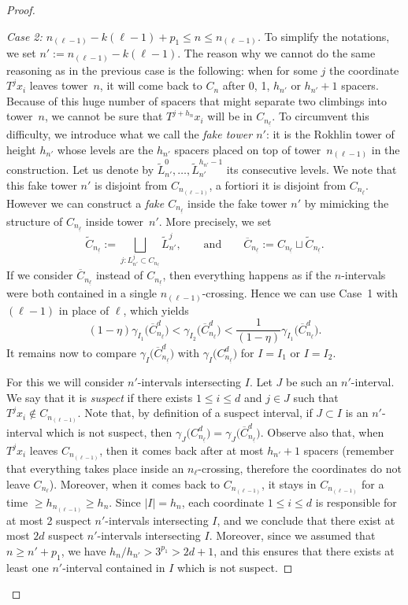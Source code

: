 \documentclass[AHL,Unicode,longabstracts]{cedram}
\newcommand{\egdef}{:=}
\newcommand{\cd}{C^{d}}
\newcommand{\lb}{\underline{\ell}}
\newcommand{\Gam}[1]{\gamma_{#1}\bigl(\cd_{n_{\lb}}\bigr)}
\newcommand{\Gamb}[1]{\gamma_{#1}\bigl(\overline{C}^d_{n_{\lb}}\bigr)}
\begin{document}
\begin{proof}
\begin{proof}[Case 2: $n_{(\ell-1)}-k(\ell-1)+p_1\le n\le n_{(\ell-1)}$]
To simplify the notations, we set $n'\egdef n_{(\ell-1)}-k(\ell-1)$. The reason why we cannot do the same reasoning as in the previous case is the following: when for some $j$ the coordinate $T^jx_i$ leaves tower~$n$, it will come back to $C_n$ after 0, 1, $h_{n'}$ or $h_{n'}+1$ spacers. Because of this huge number of spacers that might separate two climbings into tower~$n$, we cannot be sure that $T^{j+h_n}x_i$ will be in $C_{n_{\lb}}$. To circumvent this difficulty, we introduce what we call the \emph{fake tower $n'$}: it is the Rokhlin tower of height $h_{n'}$ whose levels are the $h_{n'}$ spacers placed on top of tower~$n_{(\ell-1)}$ in the construction. Let us denote by $\tilde L_{n'}^0,\ldots,\tilde L_{n'}^{h_{n'}-1}$ its consecutive levels. We note that this fake tower $n'$ is disjoint from $C_{n_{(\ell-1)}}$, a fortiori it is disjoint from $C_{n_{\lb}}$. However we can construct a \emph{fake $C_{n_{\lb}}$} inside the fake tower $n'$ by mimicking the structure of $C_{n_{\lb}}$ inside tower~$n'$. More precisely, we set
\[
\tilde C_{n_{\lb}} \egdef \bigsqcup_{j:L_{n'}^j\subset C_{n_{\lb}}} \tilde L_{n'}^j, \qquad\text{and}\qquad
\overline{C}_{n_{\lb}}\egdef C_{n_{\lb}}\sqcup \tilde C_{n_{\lb}}.
\]
If we consider $\overline{C}_{n_{\lb}}$ instead of $C_{n_{\lb}}$, then everything happens as if the $n$-intervals were both contained in a single $n_{(\ell-1)}$-crossing. Hence we can use Case~1 with $(\ell-1)$ in place of $\ell$, which yields
\begin{equation}\label{eq:case1withfake}
(1-\eta) \Gamb{I_1} < \Gamb{I_2} < \frac{1}{(1-\eta)} \Gamb{I_1}.
\end{equation}
It remains now to compare $\Gamb{I}$ with $\Gam{I}$ for $I=I_1$ or $I=I_2$.

For this we will consider $n'$-intervals intersecting $I$. Let $J$ be such an $n'$-interval. We say that it is \emph{suspect} if there exists $1\le i \le d$ and $j\in J$ such that $T^jx_i \notin C_{n_{(\ell-1)}}$. Note that, by definition of a suspect interval, if $J\subset I$ is an $n'$-interval which is not suspect, then $\Gam{J}=\Gamb{J}$. Observe also that, when $T^jx_i$ leaves $C_{n_{(\ell-1)}}$, then it comes back after at most $h_{n'}+1$ spacers (remember that everything takes place inside an $n_{\ell}$-crossing, therefore the coordinates do not leave $C_{n_\ell}$). Moreover, when it comes back to $C_{n_{(\ell-1)}}$, it stays in $C_{n_{(\ell-1)}}$ for a time $\ge h_{n_{(\ell-1)}}\ge h_n$. Since $|I|=h_n$, each coordinate $1\le i\le d$ is responsible for at most 2 suspect $n'$-intervals intersecting $I$, and we conclude that there exist at most $2d$ suspect $n'$-intervals intersecting $I$. Moreover, since we assumed that $n\ge n'+p_1$, we have $h_n/h_{n'}>3^{p_1}>2d+1$, and this ensures that there exists at least one $n'$-interval contained in $I$ which is not suspect.


\end{proof}
\end{proof}
\end{document}
